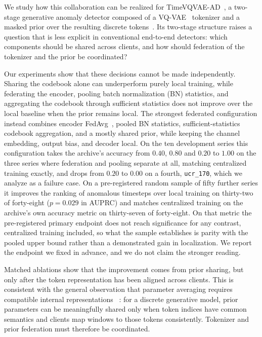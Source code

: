 \documentclass[conference]{IEEEtran}
\begin{document}
We study how this collaboration can be realized for
TimeVQVAE-AD~\cite{lee2024timevqvaead}, a two-stage generative anomaly detector composed of a
VQ-VAE~\cite{van2017neural} tokenizer and a masked prior over the resulting discrete
tokens~\cite{lee2023timevqvae}. Its two-stage structure raises a question that is less
explicit in conventional end-to-end detectors: which components should be shared across
clients, and how should federation of the tokenizer and the prior be coordinated?

Our experiments show that these decisions cannot be made independently. Sharing the codebook
alone can underperform purely local training, while federating the encoder, pooling batch
normalization (BN) statistics, and aggregating the codebook through sufficient statistics
does not improve over the local baseline when the prior remains local. The strongest
federated configuration instead combines encoder FedAvg~\cite{mcmahan2017federated}, pooled
BN statistics, sufficient-statistics codebook aggregation, and a mostly shared prior, while
keeping the channel embedding, output bias, and decoder local.
On the ten development series this configuration takes the archive's accuracy from $0.40$, $0.80$
and $0.20$ to $1.00$ on the three series where federation and pooling separate at all, matching
centralized training exactly, and drops from $0.20$ to $0.00$ on a fourth, \texttt{ucr\_170},
which we analyze as a failure case. On a pre-registered random sample of fifty further series it
improves the ranking of anomalous timesteps over local training on thirty-two of forty-eight
($p=0.029$ in AUPRC) and matches centralized training on the archive's own accuracy metric on
thirty-seven of forty-eight. On that metric the pre-registered primary endpoint does not reach
significance for any contrast, centralized training included, so what the sample establishes is
parity with the pooled upper bound rather than a demonstrated gain in localization. We report the
endpoint we fixed in advance, and we do not claim the stronger reading.

Matched ablations show that the improvement comes from prior sharing, but only after the
token representation has been aligned across clients. This is consistent with the general
observation that parameter averaging requires compatible internal representations
~\cite{entezari2022permutation,ainsworth2023gitrebasin,wang2020fedma}: for a discrete
generative model, prior parameters can be meaningfully shared only when token indices have
common semantics and clients map windows to those tokens consistently. Tokenizer and prior
federation must therefore be coordinated.
\end{document}
